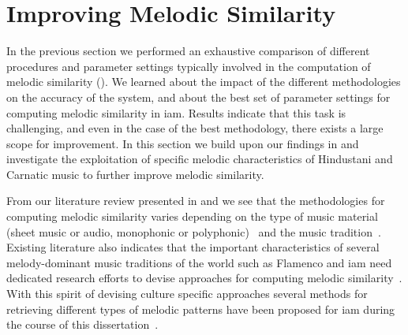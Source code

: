 
\section{Improving Melodic Similarity}
\label{sec:patterns_improving_melodic_similarity}

In the previous section we performed an exhaustive comparison of different procedures and parameter settings typically involved in the computation of melodic similarity (). We learned about the impact of the different methodologies on the accuracy of the system, and about the best set of parameter settings for computing melodic similarity in \gls{iam}. Results indicate that this task is challenging, and even in the case of the best methodology, there exists a large scope for improvement. In this section we build upon our findings in  and investigate the exploitation of specific melodic characteristics of Hindustani and Carnatic music to further improve melodic similarity. 

From our literature review presented in  and  we see that the methodologies for computing melodic similarity varies depending on the type of music material (sheet music or audio, monophonic or polyphonic)~\citep{Marsden2012,meredith2002algorithms,Cambouropoulos2001,collins2014bridging,ghias1995query,dannenberg2007comparative,mazzoni2001melody} and the music tradition~\citep{Juhasz2009a, Conklin2010a,Lartillot2006,pikrakis2003recognition}. Existing literature also indicates that the important characteristics of several melody-dominant music traditions of the world such as Flamenco and \gls{iam} need dedicated research efforts to devise approaches for computing melodic similarity~\citep{gomez2012automatic,pikrakis2012tracking,pikrakis2016detection,Rao2014}. With this spirit of devising culture specific approaches several methods for retrieving different types of melodic patterns have been proposed for \gls{iam} during the course of this dissertation~\citep{Ross2012b,Ross2012,ishwar2012motivic,Rao2014,Ishwar2013,Dutta2014,dutta2014modified}. 

